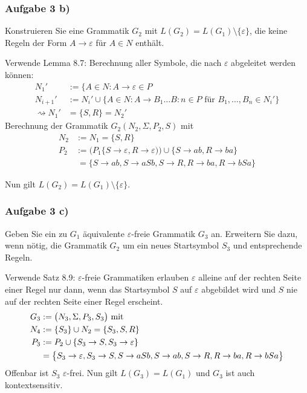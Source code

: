 \subsubsection{Aufgabe 3 b)}
Konstruieren Sie eine Grammatik $G_2$ mit $L(G_2)=L(G_1)\setminus\lbrace\varepsilon\rbrace$, die keine Regeln der Form $A\to\varepsilon$ für $A\in N$ enthält.

\begin{lösung}
	Verwende Lemma 8.7:
	Berechnung aller Symbole, die nach $\varepsilon$ abgeleitet werden können:
	\begin{align*}
		N_1'&:=\big\lbrace A\in N:A\to\varepsilon\in P\\
		N_{i+1}'&:=N_i'\cup\big\lbrace A\in N:A\to B_1\ldots B:n\in P\text{ für }B_1,\ldots,B_n\in N_i'\big\rbrace\\
		\rightsquigarrow N_1'&=\lbrace S,R\rbrace=N_2'
	\end{align*}
	Berechnung der Grammatik $G_2(N_2,\Sigma,P_2,S)$ mit 
	\begin{align*}
		N_2&:=N_1=\lbrace S,R\rbrace\\
		P_2&:=\big(P_1\lbrace S\to\varepsilon,R\to\varepsilon)\big)\cup\lbrace S\to ab, R\to ba\rbrace\\
		&~=\big\lbrace
			S\to ab, S\to aSb,S\to R,R\to ba,R\to bSa
		\big\rbrace
	\end{align*}
	
	Nun gilt $L(G_2)=L(G_1)\setminus\lbrace\varepsilon\rbrace$.
\end{lösung}

\subsubsection{Aufgabe 3 c)}
Geben Sie ein zu $G_1$ äquivalente $\varepsilon$-freie Grammatik $G_3$ an.
Erweitern Sie dazu, wenn nötig, die Grammatik $G_2$ um ein neues Startsymbol $S_3$ und entsprechende Regeln.

\begin{lösung}
	Verwende Satz 8.9:
	$\varepsilon$-freie Grammatiken erlauben $\varepsilon$ alleine auf der rechten Seite einer Regel nur dann, wenn das Startsymbol $S$ auf $\varepsilon$ abgebildet wird und $S$ nie auf der rechten Seite einer Regel erscheint.
	\begin{align*}
		G_3&:=\big(N_3,\Sigma,P_3,S_3\big)\mit\\
		N_4&:=\lbrace S_3\rbrace\cup N_2=\lbrace S_3,S,R\rbrace\\
		P_3&:=P_2\cup\lbrace S_3\to S,S_3\to\varepsilon\rbrace\\
		&=\big\lbrace
			S_3\to\varepsilon, S_3\to S, S\to aSb, S\to ab, S\to R,R\to ba,R\to bSa
		\big\rbrace
	\end{align*}
	Offenbar ist $S_3$ $\varepsilon$-frei.
	Nun gilt $L(G_3)=L(G_1)$ und $G_3$ ist auch kontextsensitiv.
\end{lösung}

